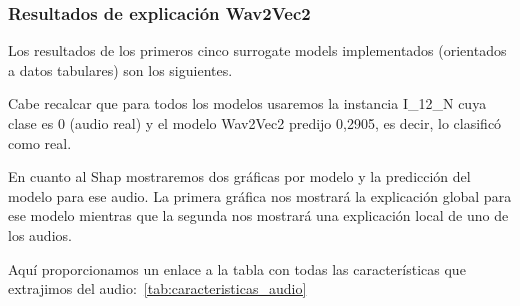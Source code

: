 \subsubsection*{Resultados de explicación Wav2Vec2}

Los resultados de los primeros cinco surrogate models implementados (orientados a datos tabulares) son los siguientes. 

Cabe recalcar que para todos los modelos usaremos la instancia I\_12\_N cuya clase es 0 (audio real) y el modelo Wav2Vec2 predijo 0,2905, es decir, lo clasificó como real.

En cuanto al Shap mostraremos dos gráficas por modelo y la predicción del modelo para ese audio. La primera gráfica nos mostrará la explicación global para ese modelo mientras que la segunda nos mostrará una explicación local de uno de los audios. 

Aquí proporcionamos un enlace a la tabla con todas las características que extrajimos del audio:~\ref{tab:caracteristicas_audio}

